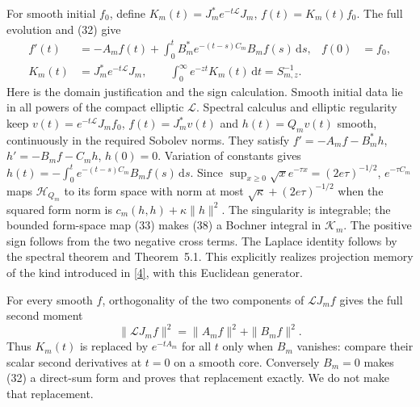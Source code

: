 \documentclass[11pt]{article}
\newcommand{\dd}{\,\mathrm d}
\newcommand{\HH}{\mathscr H}
\newcommand{\KK}{\mathscr K}
\newcommand{\LL}{\mathscr L}
\begin{document}
For smooth initial $f_0$, define
$K_m(t)=J_m^*e^{-t\LL}J_m$, $f(t)=K_m(t)f_0$.
The full evolution and (32) give
\begin{align}
 f'(t)&=-A_m f(t)+\int_0^t B_m^*e^{-(t-s)C_m}B_m f(s)\dd s,
       &f(0)&=f_0,\label{eq:memory}\\
 K_m(t)&=J_m^*e^{-t\LL}J_m,\qquad
 \int_0^\infty e^{-zt}K_m(t)\dd t=S_{m,z}^{-1}.\label{eq:laplace}
\end{align}
Here is the domain justification and the sign calculation. Smooth initial
data lie in all powers of the compact elliptic $\LL$. Spectral calculus
and elliptic regularity keep $v(t)=e^{-t\LL}J_mf_0$, $f(t)=J_m^*v(t)$
and $h(t)=Q_mv(t)$ smooth, continuously in the required Sobolev norms.
They satisfy $f'=-A_mf-B_m^*h$, $h'=-B_mf-C_mh$, $h(0)=0$.
Variation of constants gives
$h(t)=-\int_0^te^{-(t-s)C_m}B_mf(s)\dd s$.
Since $\sup_{x\geq0}\sqrt{x}e^{-\tau x}=(2e\tau)^{-1/2}$,
$e^{-\tau C_m}$ maps $\HH_{Q_m}$ to its form space with norm at most
$\sqrt\kappa+(2e\tau)^{-1/2}$ when the squared form norm is
$c_m(h,h)+\kappa\|h\|^2$. The singularity is integrable; the bounded form-space
map (33) makes (38) a Bochner integral in
$\KK_m$. The positive sign follows from the two negative cross terms.
The Laplace identity follows by the spectral theorem and
Theorem~5.1. This explicitly realizes projection memory of
the kind introduced in \href{https://doi.org/10.1143/PTP.33.423}{[4]}, with this Euclidean generator.

For every smooth $f$, orthogonality of the two components of
$\LL J_mf$ gives the full second moment
\begin{equation}\label{eq:second}
 \|\LL J_mf\|^2=\|A_mf\|^2+\|B_mf\|^2.
\end{equation}
Thus $K_m(t)$ is replaced by $e^{-tA_m}$ for all $t$ only when $B_m$
vanishes: compare their scalar second derivatives at $t=0$ on a smooth
core. Conversely $B_m=0$ makes (32) a direct-sum form and
proves that replacement exactly. We do not make that replacement.
\end{document}
